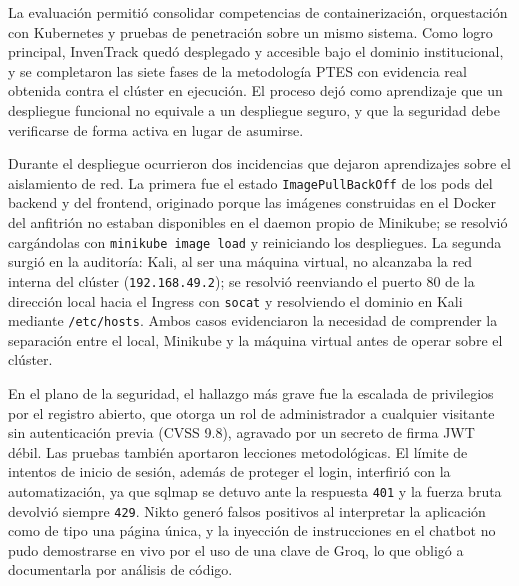 \documentclass[stu,11pt,spanish,floatsintext]{apa7}
\begin{document}
La evaluación permitió consolidar competencias de containerización, orquestación con Kubernetes y pruebas de penetración sobre un mismo sistema. Como logro principal, InvenTrack quedó desplegado y accesible bajo el dominio institucional, y se completaron las siete fases de la metodología PTES con evidencia real obtenida contra el clúster en ejecución. El proceso dejó como aprendizaje que un despliegue funcional no equivale a un despliegue seguro, y que la seguridad debe verificarse de forma activa en lugar de asumirse.

Durante el despliegue ocurrieron dos incidencias que dejaron aprendizajes sobre el aislamiento de red. La primera fue el estado \texttt{ImagePullBackOff} de los pods del backend y del frontend, originado porque las imágenes construidas en el Docker del anfitrión no estaban disponibles en el daemon propio de Minikube; se resolvió cargándolas con \texttt{minikube image load} y reiniciando los despliegues. La segunda surgió en la auditoría: Kali, al ser una máquina virtual, no alcanzaba la red interna del clúster (\texttt{192.168.49.2}); se resolvió reenviando el puerto 80 de la dirección local hacia el Ingress con \texttt{socat} y resolviendo el dominio en Kali mediante \texttt{/etc/hosts}. Ambos casos evidenciaron la necesidad de comprender la separación entre el local, Minikube y la máquina virtual antes de operar sobre el clúster.

En el plano de la seguridad, el hallazgo más grave fue la escalada de privilegios por el registro abierto, que otorga un rol de administrador a cualquier visitante sin autenticación previa (CVSS 9.8), agravado por un secreto de firma JWT débil. Las pruebas también aportaron lecciones metodológicas. El límite de intentos de inicio de sesión, además de proteger el login, interfirió con la automatización, ya que sqlmap se detuvo ante la respuesta \texttt{401} y la fuerza bruta devolvió siempre \texttt{429}. Nikto generó falsos positivos al interpretar la aplicación como de tipo una página única, y la inyección de instrucciones en el chatbot no pudo demostrarse en vivo por el uso de una clave de Groq, lo que obligó a documentarla por análisis de código.
\end{document}
